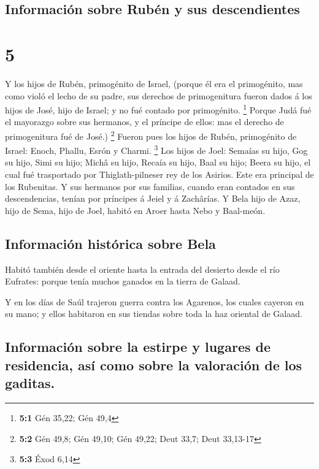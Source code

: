 \hypertarget{informaciuxf3n-sobre-rubuxe9n-y-sus-descendientes}{%
\subsection{Información sobre Rubén y sus
descendientes}\label{informaciuxf3n-sobre-rubuxe9n-y-sus-descendientes}}

\hypertarget{section-4}{%
\section{5}\label{section-4}}

 Y los hijos de Rubén, primogénito de Israel, (porque él era
el primogénito, mas como violó el lecho de su padre, sus derechos de
primogenitura fueron dados á los hijos de José, hijo de Israel; y no fué
contado por primogénito. \footnote{\textbf{5:1} Gén 35,22; Gén 49,4}
 Porque Judá fué el mayorazgo sobre sus hermanos, y el
príncipe de ellos: mas el derecho de primogenitura fué de José.)
\footnote{\textbf{5:2} Gén 49,8; Gén 49,10; Gén 49,22; Deut 33,7; Deut
  33,13-17}  Fueron pues los hijos de Rubén, primogénito de
Israel: Enoch, Phallu, Esrón y Charmi. \footnote{\textbf{5:3} Éxod 6,14}
 Los hijos de Joel: Semaías su hijo, Gog su hijo, Simi su
hijo;  Michâ su hijo, Recaía su hijo, Baal su hijo;
 Beera su hijo, el cual fué trasportado por
Thiglath-pilneser rey de los Asirios. Este era principal de los
Rubenitas.  Y sus hermanos por sus familias, cuando eran
contados en sus descendencias, tenían por príncipes á Jeiel y á
Zachârías.  Y Bela hijo de Azaz, hijo de Sema, hijo de Joel,
habitó en Aroer hasta Nebo y Baal-meón.

\hypertarget{informaciuxf3n-histuxf3rica-sobre-bela}{%
\subsection{Información histórica sobre
Bela}\label{informaciuxf3n-histuxf3rica-sobre-bela}}

 Habitó también desde el oriente hasta la entrada del
desierto desde el río Eufrates: porque tenía muchos ganados en la tierra
de Galaad.

 Y en los días de Saúl trajeron guerra contra los Agarenos,
los cuales cayeron en su mano; y ellos habitaron en sus tiendas sobre
toda la haz oriental de Galaad.

\hypertarget{informaciuxf3n-sobre-la-estirpe-y-lugares-de-residencia-asuxed-como-sobre-la-valoraciuxf3n-de-los-gaditas.}{%
\subsection{Información sobre la estirpe y lugares de residencia, así
como sobre la valoración de los
gaditas.}\label{informaciuxf3n-sobre-la-estirpe-y-lugares-de-residencia-asuxed-como-sobre-la-valoraciuxf3n-de-los-gaditas.}}

